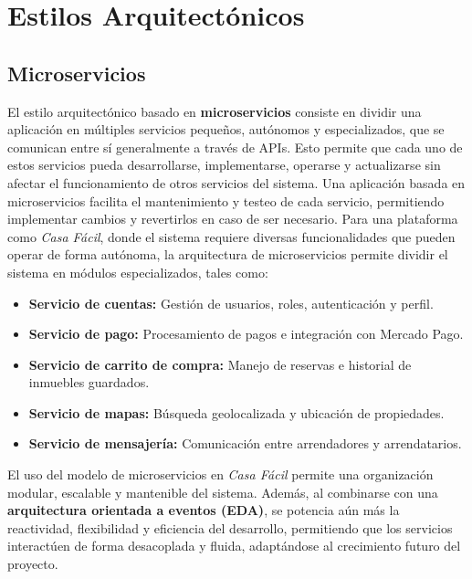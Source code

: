 \section{Estilos Arquitectónicos}
	\subsection{Microservicios}
		\noindent El estilo arquitectónico basado en \textbf{microservicios} consiste en dividir una aplicación en múltiples servicios pequeños, autónomos y especializados, que se comunican entre sí generalmente a través de APIs.
		\noindent Esto permite que cada uno de estos servicios pueda desarrollarse, implementarse, operarse y actualizarse sin afectar el funcionamiento de otros servicios del sistema. Una aplicación basada en microservicios facilita el mantenimiento y testeo de cada servicio, permitiendo implementar cambios y revertirlos en caso de ser necesario.
		\noindent Para una plataforma como \textit{Casa Fácil}, donde el sistema requiere diversas funcionalidades que pueden operar de forma autónoma, la arquitectura de microservicios permite dividir el sistema en módulos especializados, tales como:
		
		\begin{itemize}
			\item \textbf{Servicio de cuentas:} Gestión de usuarios, roles, autenticación y perfil.
			\item \textbf{Servicio de pago:} Procesamiento de pagos e integración con Mercado Pago.
			\item \textbf{Servicio de carrito de compra:} Manejo de reservas e historial de inmuebles guardados.
			\item \textbf{Servicio de mapas:} Búsqueda geolocalizada y ubicación de propiedades.
			\item \textbf{Servicio de mensajería:} Comunicación entre arrendadores y arrendatarios.
		\end{itemize}
		
		\noindent El uso del modelo de microservicios en \textit{Casa Fácil} permite una organización modular, escalable y mantenible del sistema. Además, al combinarse con una \textbf{arquitectura orientada a eventos (EDA)}, se potencia aún más la reactividad, flexibilidad y eficiencia del desarrollo, permitiendo que los servicios interactúen de forma desacoplada y fluida, adaptándose al crecimiento futuro del proyecto.